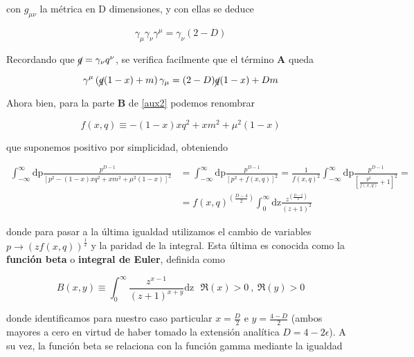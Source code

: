 \documentclass{article}
\numberwithin{equation}{section}
\begin{document}
con $ g_{\mu\nu} $ la métrica en D dimensiones, y con ellas se deduce

\begin{equation}\label{key}
\gamma_{\mu}\gamma_{\nu}\gamma^{\mu}=\gamma_{\nu}(2-D)
\end{equation}

Recordando que $ \cancel{q}=\gamma_{\nu}q^{\nu} $, se verifica facilmente que el término $ \textbf{A} $ queda

\begin{equation}\label{A}
\gamma^{\mu}\left(\cancel{q}(1-x)+m\right) \gamma_{\mu} = (2-D)\cancel{q}(1-x)+Dm
\end{equation}

Ahora bien, para la parte $ \textbf{B} $ de \ref{aux2} podemos renombrar 

\begin{equation}\label{key}
f(x,q) \equiv -(1-x)xq^{2} + x m^{2} + \mu^{2}(1-x)
\end{equation}

que suponemos positivo por simplicidad, obteniendo

\begin{equation}\label{key}
\begin{aligned}
\int_{-\infty}^{\infty}\mathrm{dp}\frac{p^{D-1}}{\left[p^{2}-(1-x)xq^{2} + x m^{2} + \mu^{2}(1-x)\right]^{2}} &= \int_{-\infty}^{\infty}\mathrm{dp}\frac{p^{D-1}}{\left[p^{2} + f(x,q)\right]^2}= \frac{1}{f(x,q)^2}\int_{-\infty}^{\infty}\mathrm{dp}\frac{p^{D-1}}{\left[\frac{p^{2}}{f(x,q)} + 1\right]^2} =\\
&= f(x,q)^{\left(\frac{D-4}{2}\right)} \int_0^{\infty}\mathrm{dz}\frac{z^{\left(\frac{D-2}{2}\right)}}{\left(z + 1\right)^2}
\end{aligned}
\end{equation}

donde para pasar a la última igualdad utilizamos el cambio de variables $ p \longrightarrow \left(zf(x,q)\right)^{\frac{1}{2}} $ y la paridad de la integral. Esta última es conocida como la \textbf{función beta} o \textbf{integral de Euler}, definida como

\begin{equation}\label{key}
B(x,y) \equiv \int_0^{\infty} \frac{z^{x-1}}{(z+1)^{x+y}}\mathrm{dz} \ \ \ \Re(x)>0 \ , \ \Re(y)>0
\end{equation}

donde identificamos para nuestro caso particular $ x= \frac{D}{2} $ e $ y= \frac{4-D}{2} $ (ambos mayores a cero en virtud de haber tomado la extensión analítica $ D=4-2\epsilon $). A su vez, la función beta se relaciona con la función gamma mediante la igualdad
\end{document}
